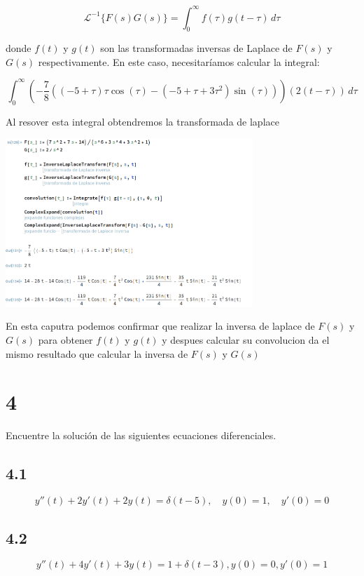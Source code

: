 \documentclass{article}
\begin{document}
\[
    \mathcal{L}^{-1}\{F(s)G(s)\} = \int_0^{\infty} f(\tau)g(t - \tau) \, d\tau
\]

donde $f(t)$ y $g(t)$ son las transformadas inversas de Laplace de $F(s)$ y $G(s)$ respectivamente. En este caso, necesitaríamos calcular la integral:

\[
    \int_0^{\infty} \left(-\frac{7}{8} \left((-5 + \tau) \tau\cos(\tau) - (-5+\tau+3\tau^2)\sin(\tau)\right)\right)(2(t - \tau)) \, d\tau
\]

Al resover esta integral obtendremos la transformada de laplace

\begin{center}
    \includegraphics[width=0.7\textwidth]{./image3.png}
\end{center}

En esta caputra podemos confirmar que realizar la inversa de laplace de $F(s)$ y $G(s)$ para obtener $f(t)$ y $g(t)$ y despues calcular su convolucion da el mismo resultado que calcular la inversa de $F(s)$ y $G(s)$

\section{4}
Encuentre la solución de las siguientes ecuaciones diferenciales.

\subsection{4.1}

\[
    y''(t) + 2y'(t) + 2y(t) = \delta(t-5), \quad y(0)=1, \quad y'(0)=0
\]
\subsection{4.2}

\[
    y''(t) + 4y'(t) + 3y(t) = 1 + \delta(t-3), y(0)=0, y'(0) = 1
\]
\end{document}

